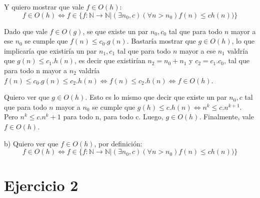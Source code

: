 \documentclass[11pt, spanish]{article}
\begin{document}
Y quiero mostrar que vale $f \in  O(h)$:
\[
f \in  O(h) \iff f \in \{f : \mathbb{N} \to \mathbb{N} | (\exists n_0, c)(\forall n > n_0) f(n) \leq ch(n)) \}
\]

Dado que vale $f \in  O(g)$, se que existe un par $n_0,c_0$ tal que para todo $n$ mayor a ese $n_0$ se cumple que $f(n) \leq c_0.g(n)$. Bastaría mostrar que $g \in O(h)$, lo que implicaría que existiría un par $n_1, c_1$ tal que para todo $n$ mayor a ese $n_1$ valdría que $g(n) \leq c_1.h(n)$, es decir que existirían $n_2=n_0+n_1$ y $c_2=c_1.c_0$, tal que para todo n mayor a $n_2$ valdría $f(n) \leq c_0.g(n) \leq c_2.h(n) \iff f(n) \leq c_2.h(n) \iff f \in O(h)$.

Quiero ver que $g \in O(h)$. Esto es lo mismo que decir que existe un par $n_0, c$ tal que para todo $n$ mayor a $n_0$ se cumple que $g(h) \leq c.h(n) \iff n^k \leq c.n^{k+1}$. Pero $n^k \leq c.n^k+1$ para todo n, para todo c. Luego, $g \in O(h)$. Finalmente, vale $f \in O(h)$.

%
%
\vspace{1em}
b) Quiero ver que $f \in O(h)$, por definición:
\[
f \in  O(h) \iff f \in \{f : \mathbb{N} \to \mathbb{N} | (\exists n_0, c)(\forall n > n_0) f(n) \leq ch(n)) \}
\] 

\section*{Ejercicio 2}
\end{document}
